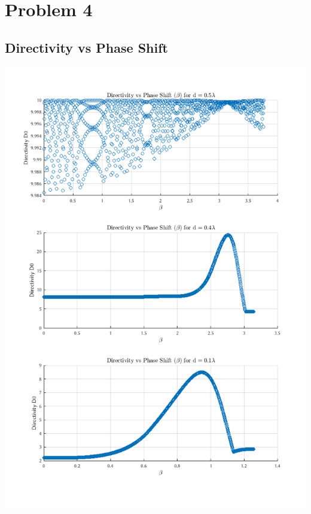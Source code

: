 \section{Problem 4}


\subsection{Directivity vs Phase Shift}

\includegraphics[scale=.75]{homework4_3graphs.png}

